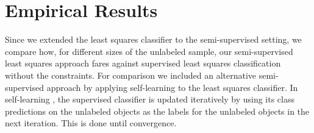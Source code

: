 \documentclass{llncs}
\newcommand{\Xe}{\mathbf{X}_e  }
\newcommand{\XeT}{\mathbf{X}_e^{\top}}
\begin{document}

\section{Empirical Results} 
\label{section:empiricalresults}


Since we extended the least squares classifier to the semi-supervised setting, we compare how, for different sizes of the unlabeled sample,  our semi-supervised least squares approach fares against supervised least squares classification without the constraints. For comparison we included an alternative semi-supervised approach by applying self-learning to the least squares classifier. In self-learning \cite{McLachlan1975}, the supervised classifier is updated iteratively by using its class predictions on the unlabeled objects as the labels for the unlabeled objects in the next iteration. This is done until convergence.

\end{document}
